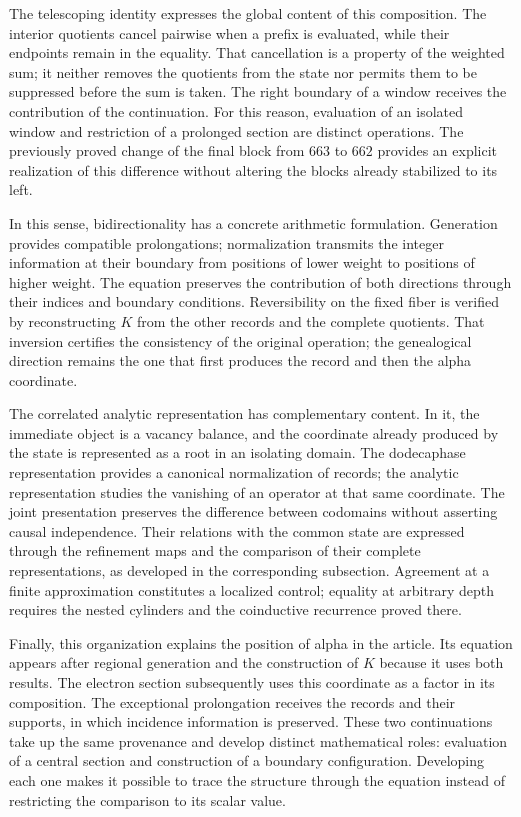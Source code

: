 The telescoping identity expresses the global content of this composition.
The interior quotients cancel pairwise when a prefix is evaluated, while
their endpoints remain in the equality. That cancellation is a property of
the weighted sum; it neither removes the quotients from the state nor permits
them to be suppressed before the sum is taken. The right boundary of a window
receives the contribution of the continuation. For this reason, evaluation of
an isolated window and restriction of a prolonged section are distinct
operations. The previously proved change of the final block from $663$ to
$662$ provides an explicit realization of this difference without altering
the blocks already stabilized to its left.

In this sense, bidirectionality has a concrete arithmetic formulation.
Generation provides compatible prolongations; normalization transmits the
integer information at their boundary from positions of lower weight to
positions of higher weight. The equation preserves the contribution of both
directions through their indices and boundary conditions. Reversibility on
the fixed fiber is verified by reconstructing $K$ from the other records and
the complete quotients. That inversion certifies the consistency of the
original operation; the genealogical direction remains the one that first
produces the record and then the alpha coordinate.

The correlated analytic representation has complementary content. In it, the
immediate object is a vacancy balance, and the coordinate already produced by
the state is represented as a root in an isolating domain. The dodecaphase
representation provides a canonical normalization of records; the analytic
representation studies the vanishing of an operator at that same coordinate.
The joint presentation preserves the difference between codomains without
asserting causal independence. Their relations with the common state are
expressed through the refinement maps and the comparison of their complete
representations, as developed in the corresponding subsection. Agreement at a
finite approximation constitutes a localized control; equality at arbitrary
depth requires the nested cylinders and the coinductive recurrence proved
there.

Finally, this organization explains the position of alpha in the article.
Its equation appears after regional generation and the construction of $K$
because it uses both results. The electron section subsequently uses this
coordinate as a factor in its composition. The exceptional prolongation
receives the records and their supports, in which incidence information is
preserved. These two continuations take up the same provenance and develop
distinct mathematical roles: evaluation of a central section and
construction of a boundary configuration. Developing each one makes it
possible to trace the structure through the equation instead of restricting
the comparison to its scalar value.
